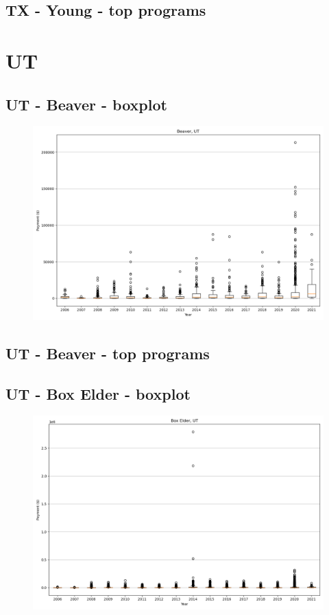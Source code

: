 \subsection*{TX - Young - top programs}

\newpage
\section*{UT}
\subsection*{UT - Beaver - boxplot}
\begin{figure}[h]
\centering
\includegraphics[width=7in]{../output/boxplots/counties/Beaver-UT_boxplot.png}
\end{figure}


\subsection*{UT - Beaver - top programs}

\newpage
\subsection*{UT - Box Elder - boxplot}
\begin{figure}[h]
\centering
\includegraphics[width=7in]{../output/boxplots/counties/Box Elder-UT_boxplot.png}
\end{figure}


